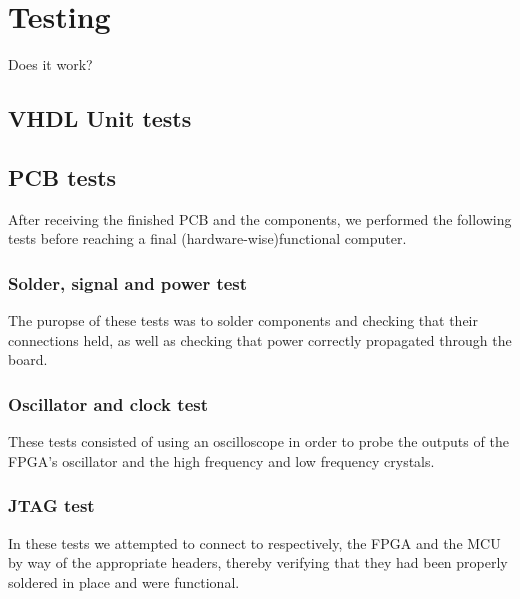 \documentclass[../main/report.tex]{subfiles}
\begin{document}
\chapter{Testing}

Does it work?

\section{VHDL Unit tests}




\section{PCB tests}

After receiving the finished PCB and the components, we performed the following tests before reaching a final (hardware-wise)functional computer.   

\subsection{Solder, signal and power test}
The puropse of these tests was to solder components and checking that their connections held, as well as checking that power correctly propagated through the board.  


\subsection{Oscillator and clock test}
These tests consisted of using an oscilloscope in order to probe the outputs of the FPGA's oscillator and the high frequency and low frequency crystals.


\subsection{JTAG test}
In these tests we attempted to connect to respectively, the FPGA and the MCU by way of the appropriate headers, thereby verifying that they had been properly soldered in place and were functional.

\end{document}
